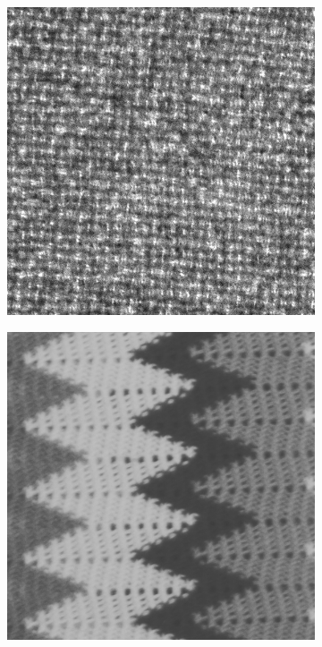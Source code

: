 \begin{figure}[h!]
\begin{subfigure}{.15\textwidth}
  \centering
  \includegraphics[width=.8\linewidth]{kylberg_examples/blanket1_002.png}
\end{subfigure}%
\begin{subfigure}{.15\textwidth}
  \centering
  \includegraphics[width=.8\linewidth]{kylberg_examples/blanket2_002.png}
\end{subfigure}
\begin{subfigure}{.15\textwidth}
  \centering

\end{subfigure}
\end{figure}
